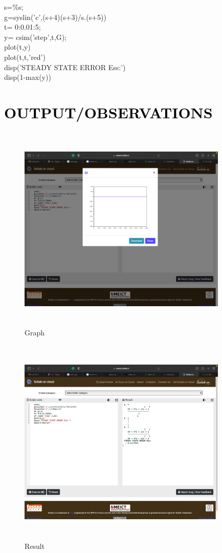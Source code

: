 \documentclass[12pt]{article}
\begin{document}
   s=\%s;\\ 
   g=syslin('c',(s+4)(s+3)/s.(s+5))\\
   t= 0:0.01:5;\\
   y= csim('step',t,G);\\
   plot(t,y)\\
    plot(t,t,'red')\\
   disp('STEADY STATE ERROR Ess:')\\
   disp(1-max(y)) \par 

\section*{\textcolor{black}{OUTPUT/OBSERVATIONS}}

\begin{figure}[!hth]
        \centering
        \includegraphics[width =10cm, height = 10cm]{images/exp71.png}
        \caption{Graph}
        \label{Graph}
\end{figure}
\begin{figure}[!hth]
        \centering
        \includegraphics[width =10cm, height = 10cm]{images/exp72.png}
        \caption{Result}
        \label{Result}
\end{figure}
\end{document}
